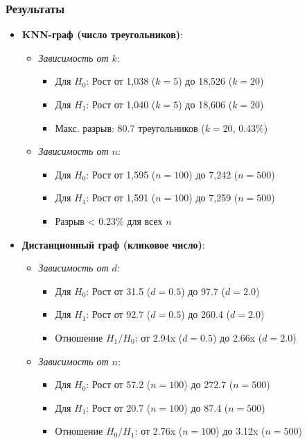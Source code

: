 \documentclass[a4paper, 12pt]{article}
\begin{document}
\subsubsection*{Результаты}
\begin{itemize}
    \item \textbf{KNN-граф (число треугольников)}:
        \begin{itemize}
            \item \textit{Зависимость от \(k\)}:
                \begin{itemize}
                    \item Для \(H_0\): Рост от 1,038 (\(k=5\)) до 18,526 (\(k=20\))
                    \item Для \(H_1\): Рост от 1,040 (\(k=5\)) до 18,606 (\(k=20\))
                    \item Макс. разрыв: 80.7 треугольников (\(k=20\), 0.43\%)
                \end{itemize}
            \item \textit{Зависимость от \(n\)}:
                \begin{itemize}
                    \item Для \(H_0\): Рост от 1,595 (\(n=100\)) до 7,242 (\(n=500\))
                    \item Для \(H_1\): Рост от 1,591 (\(n=100\)) до 7,259 (\(n=500\))
                    \item Разрыв < 0.23\% для всех \(n\)
                \end{itemize}
        \end{itemize}

    \item \textbf{Дистанционный граф (кликовое число)}:
        \begin{itemize}
            \item \textit{Зависимость от \(d\)}:
                \begin{itemize}
                    \item Для \(H_0\): Рост от 31.5 (\(d=0.5\)) до 97.7 (\(d=2.0\))
                    \item Для \(H_1\): Рост от 92.7 (\(d=0.5\)) до 260.4 (\(d=2.0\))
                    \item Отношение \(H_1/H_0\): от 2.94x (\(d=0.5\)) до 2.66x (\(d=2.0\))
                \end{itemize}
            \item \textit{Зависимость от \(n\)}:
                \begin{itemize}
                    \item Для \(H_0\): Рост от 57.2 (\(n=100\)) до 272.7 (\(n=500\))
                    \item Для \(H_1\): Рост от 20.7 (\(n=100\)) до 87.4 (\(n=500\))
                    \item Отношение \(H_0/H_1\): от 2.76x (\(n=100\)) до 3.12x (\(n=500\))
                \end{itemize}
        \end{itemize}
\end{itemize}
\end{document}

